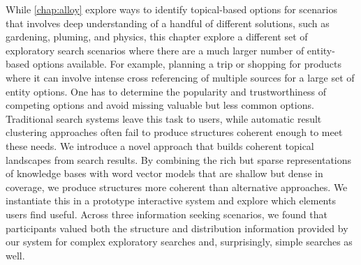 
While \cref{chap:alloy} explore ways to identify topical-based options for scenarios that involves deep understanding of a handful of different solutions, such as gardening, pluming, and physics, this chapter explore a different set of exploratory search scenarios where there are a much larger number of entity-based options available. For example, planning a trip or shopping for products where it can involve intense cross referencing of multiple sources for a large set of entity options. One has to determine the popularity and trustworthiness of competing options and avoid missing valuable but less common options. Traditional search systems leave this task to users, while automatic result clustering approaches often fail to produce structures coherent enough to meet these needs. We introduce a novel approach that builds coherent topical landscapes from search results. By combining the rich but sparse representations of knowledge bases with word vector models that are shallow but dense in coverage, we produce structures more coherent than alternative approaches. We instantiate this in a prototype interactive system and explore which elements users find useful. Across three information seeking scenarios, we found that participants valued both the structure and distribution information provided by our system for complex exploratory searches and, surprisingly, simple searches as well.  



